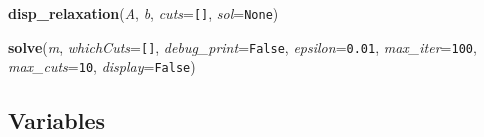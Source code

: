 \hspace{.8\funcindent}\begin{boxedminipage}{\funcwidth}

    \raggedright \textbf{disp\_relaxation}(\textit{A}, \textit{b}, \textit{cuts}={\tt \texttt{[}\texttt{]}}, \textit{sol}={\tt None})

\setlength{\parskip}{2ex}
\setlength{\parskip}{1ex}
    \end{boxedminipage}

    \label{coinor:cuppy:cuttingPlanes:solve}

    \vspace{0.5ex}

\hspace{.8\funcindent}\begin{boxedminipage}{\funcwidth}

    \raggedright \textbf{solve}(\textit{m}, \textit{whichCuts}={\tt \texttt{[}\texttt{]}}, \textit{debug\_print}={\tt False}, \textit{epsilon}={\tt 0.01}, \textit{max\_iter}={\tt 100}, \textit{max\_cuts}={\tt 10}, \textit{display}={\tt False})

\setlength{\parskip}{2ex}
\setlength{\parskip}{1ex}
    \end{boxedminipage}



  \subsection{Variables}

